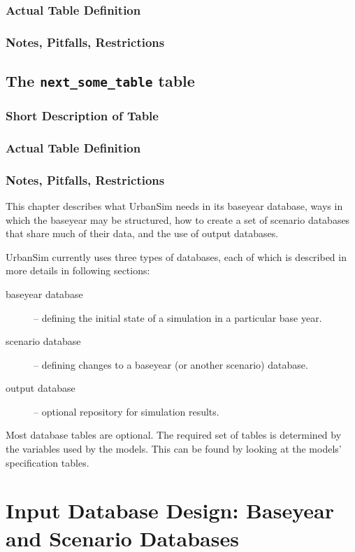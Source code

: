 \subsubsection{Actual Table Definition}
\subsubsection{Notes, Pitfalls, Restrictions}
\subsection{The {\tt next_some_table} table}
\subsubsection{Short Description of Table}
\subsubsection{Actual Table Definition}
\subsubsection{Notes, Pitfalls, Restrictions}

This chapter describes what UrbanSim needs in its baseyear database, ways in
which the baseyear may be structured, how to create a set of scenario databases
that share much of their data, and the use of output databases.

UrbanSim currently uses three types of databases, each of which is described in
more details in following sections:

\begin{description}
\item[baseyear database] -- defining the initial state of a simulation in a
particular base year.
\item[scenario database] -- defining changes to a baseyear (or another scenario)
database.
\item[output database] -- optional repository for simulation results.
\end{description}

Most database tables are optional. The required set of tables is determined by
the variables \variablesindex used by the models.  This can be found by looking at the models'
specification tables.






\section{Input Database Design: Baseyear and Scenario Databases}
\label{urbansim-database-tables-baseyear-scenario-db}

